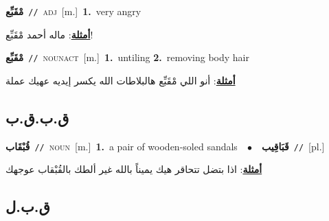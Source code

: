 \documentclass[10pt,a4paper,twoside]{article} %
\begin{document}
\begin{multicols}{2}
{\setlength\topsep{0pt}\textbf{\foreignlanguage{arabic}{مْقَبِّع}}\ {\color{gray}\texttt{//}\color{black}}\ \textsc{adj}\ [m.]\ \textbf{1.}~very angry\  \begin{flushright}\color{gray}\foreignlanguage{arabic}{\textbf{\underline{\foreignlanguage{arabic}{أمثلة}}}: ماله أحمد مْقَبِّع!}\end{flushright}\color{black}} \vspace{2mm}

{\setlength\topsep{0pt}\textbf{\foreignlanguage{arabic}{مْقَبِّع}}\ {\color{gray}\texttt{//}\color{black}}\ \textsc{noun\textunderscore act}\ [m.]\ \textbf{1.}~untiling  \textbf{2.}~removing body hair\  \begin{flushright}\color{gray}\foreignlanguage{arabic}{\textbf{\underline{\foreignlanguage{arabic}{أمثلة}}}: أنو اللي مْقَبِّع هالبلاطات الله يكسر إيديه عهيك عملة}\end{flushright}\color{black}} \vspace{2mm}

\vspace{-3mm}
\subsection*{\color{blue}\foreignlanguage{arabic}{ق.ب.ق.ب}\color{blue}{}} 

{\setlength\topsep{0pt}\textbf{\foreignlanguage{arabic}{قُبْقَاب}}\ {\color{gray}\texttt{//}\color{black}}\ \textsc{noun}\ [m.]\ \textbf{1.}~a pair of wooden-soled sandals\ \ $\bullet$\ \ \setlength\topsep{0pt}\textbf{\foreignlanguage{arabic}{قَبَاقِيب}}\ {\color{gray}\texttt{//}\color{black}}\ [pl.]\  \begin{flushright}\color{gray}\foreignlanguage{arabic}{\textbf{\underline{\foreignlanguage{arabic}{أمثلة}}}: اذا بتضل تتحاقر هيك يميناً بالله غير ألطك بالقُبْقاب عوجهك}\end{flushright}\color{black}} \vspace{2mm}

\vspace{-3mm}
\subsection*{\color{blue}\foreignlanguage{arabic}{ق.ب.ل}\color{blue}{}} 


\end{multicols}
\end{document}
